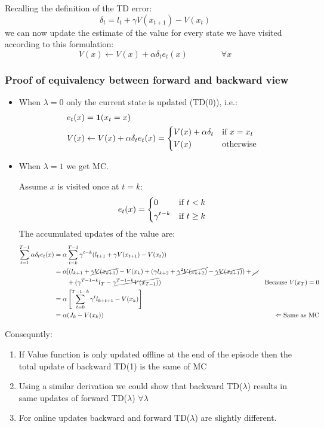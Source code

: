 Recalling the definition of the TD error:
\[\delta_t = l_t + \gamma V(x_{t+1}) - V(x_t)\]
we can now update the estimate of the value for every state we have visited according to this formulation:
\[V(x)\leftarrow V(x) + \alpha\delta_t e_t(x)\qquad\qquad\forall x\]

\subsubsection{Proof of equivalency between forward and backward view}
\begin{itemize}
\item When $\lambda = 0$ only the current state is updated (TD(0)), i.e.:
\begin{align*}
e_t(x) &= \mathbf{1}(x_t=x)\\
V(x) &\leftarrow V(x) + \alpha\delta_t e_t(x) = 
\begin{dcases}
V(x) + \alpha\delta_t &\text{if }x=x_t\\
V(x) &\text{otherwise}
\end{dcases}
\end{align*}
\item When $\lambda = 1$ we get MC. 

Assume $x$ is visited once at $t = k$:
\[e_t(x) = 
\begin{dcases}
0&\text{if }t<k\\
\gamma^{t-k}&\text{if }t\ge k
\end{dcases}\]
The accumulated updates of the value are:
\begin{align*}
\sum_{t=1}^{T-1} \alpha\delta_t e_t(x) &= \alpha \sum_{t=k}^{T-1} \gamma^{t-k} (l_{t+1} + \gamma V(x_{t+1}) - V(x_t))&\\
&= \alpha [( l_{k+1} + \cancel{\gamma V(x_{k+1})} - V(x_k) + (\gamma l_{k+2} + \cancel{\gamma^2 V(x_{k+2})} - \cancel{\gamma V(x_{k+1})}) + \cancel{...} \\
&\qquad+ (\gamma^{T-1-k}l_T-\cancel{\gamma^{T-1-k}V(x_{T-1})})& \text{Because }V(x_T) = 0\\
&= \alpha \left[ \sum_{t=0}^{T-1-k} \gamma^t l_{k+t+1} - V(x_k)\right]&\\
&=\alpha(J_k - V(x_k))&\Leftarrow \text{Same as MC}
\end{align*}
\end{itemize}
Consequntly:
\begin{enumerate}
\item If Value function is only updated offline at the end of the episode then the total update of backward TD(1) is the same of MC
\item Using a similar derivation we could show that backward TD($\lambda$) results in same updates of forward TD($\lambda$) $\forall \lambda$
\item For online updates backward and forward TD($\lambda$) are slightly different.
\end{enumerate}
























